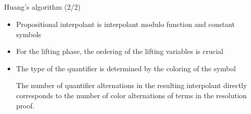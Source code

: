 \documentclass[final,compress]{beamer}
\newcommand{\gray}[1]{{\color{InfosysDarkGrey}#1}}
\begin{document}

\subsection{}
\begin{frame}{Huang's algorithm (2/2)}
	\begin{itemize}
		\item Propositional interpolant is interpolant modulo function and constant symbols
		\item For the lifting phase, the ordering of the lifting variables is crucial
		\item The type of the quantifier is determined by the coloring of the symbol

			\pause

			\begin{theorem}
				The number of quantifier alternations in the resulting interpolant directly corresponds to the number of color alternations of terms in the resolution proof.
			\end{theorem}
	\end{itemize}
\end{frame}
\end{document}
